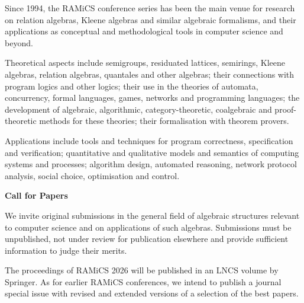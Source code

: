 \documentclass[a3paper, 12pt]{article}
\newcommand*\nfont{\fontsize{16}{19}\selectfont}
\begin{document}
\begin{minipage}[t]{.473\linewidth}
  \nfont%
  Since 1994, the RAMiCS conference series has been the main venue for
  research on relation algebras, Kleene algebras and similar algebraic
  formalisms, and their applications as conceptual and methodological
  tools in computer science and beyond.

  \medskip

  Theoretical aspects include semigroups, residuated lattices,
  semirings, Kleene algebras, relation algebras, quantales and other
  algebras; their connections with program logics and other logics;
  their use in the theories of automata, concurrency, formal
  languages, games, networks and programming languages; the
  development of algebraic, algorithmic, category-theoretic,
  coalgebraic and proof-theoretic methods for these theories; their
  formalisation with theorem provers.

  \medskip

  Applications include tools and techniques for program correctness,
  specification and verification; quantitative and qualitative models
  and semantics of computing systems and processes; algorithm design,
  automated reasoning, network protocol analysis, social choice,
  optimisation and control.

  \bigskip

  {\Large \bf Call for Papers}

  \smallskip

  We invite original submissions in the general field of algebraic
  structures relevant to computer science and on applications of such
  algebras.  Submissions must be unpublished, not under review for
  publication elsewhere and provide sufficient information to judge
  their merits.

  The proceedings of RAMiCS 2026 will be published in an LNCS volume
  by Springer.  As for earlier RAMiCS conferences, we intend to
  publish a journal special issue with revised and extended versions
  of a selection of the best papers.
\end{minipage}
\hfill
\end{document}
